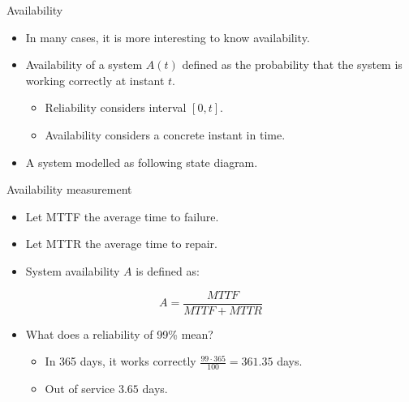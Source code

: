 \begin{frame}[t]{Availability}
\begin{itemize}
  \item In many cases, it is more interesting to know availability.
  \item Availability of a system $A(t)$ defined as the
        probability that the system is working correctly at instant $t$.
    \begin{itemize}
      \item Reliability considers interval $[0,t]$.
      \item Availability considers a concrete instant in time.
    \end{itemize}
  \item A system modelled as following state diagram.
\end{itemize}
\begin{center}
\end{center}
\end{frame}

\begin{frame}[t]{Availability measurement}
\begin{itemize}
  \item Let MTTF the average time to failure.
  \item Let MTTR the average time to repair.
  \item System availability $A$ is defined as:
\end{itemize}

\begin{equation*}
A = \frac{MTTF}{MTTF + MTTR}
\end{equation*}

\begin{itemize}
  \item What does a reliability of 99\% mean?	
    \begin{itemize}
      \item In 365 days, it works correctly $\frac{99 \cdot 365}{100} = 361.35$ days.
      \item Out of service $3.65$ days.
    \end{itemize}
\end{itemize}
\end{frame}

